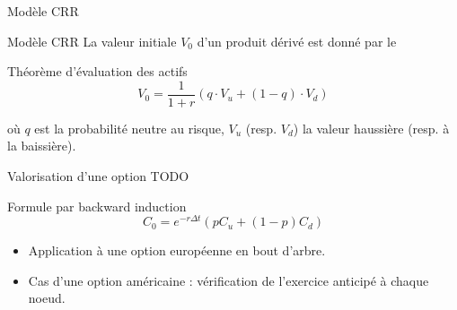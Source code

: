 \documentclass[11pt]{beamer}
\begin{document}
\begin{frame}{Modèle CRR}
\begin{center}
\end{center}
\end{frame}

\begin{frame}{Modèle CRR}
La valeur initiale \(V_0\) d'un produit dérivé est donné par le 
\begin{block}{Théorème d'évaluation des actifs}
    \[V_0 = \frac{1}{1 + r} \left( q \cdot V_u + (1 - q) \cdot V_d \right)\]
\end{block}
où \( q \) est la probabilité neutre au risque, \( V_u \) (resp. \(V_d\)) la valeur haussière (resp. à la baissière).

\end{frame}


\begin{frame}{Valorisation d'une option}
TODO
\begin{block}{Formule par backward induction}
\[
C_0 = e^{-r\Delta t} \left( p C_u + (1 - p) C_d \right)
\]
\end{block}

\begin{itemize}
    \item Application à une option européenne en bout d’arbre.
    \item Cas d’une option américaine : vérification de l’exercice anticipé à chaque noeud.
\end{itemize}
\end{frame}
\end{document}
